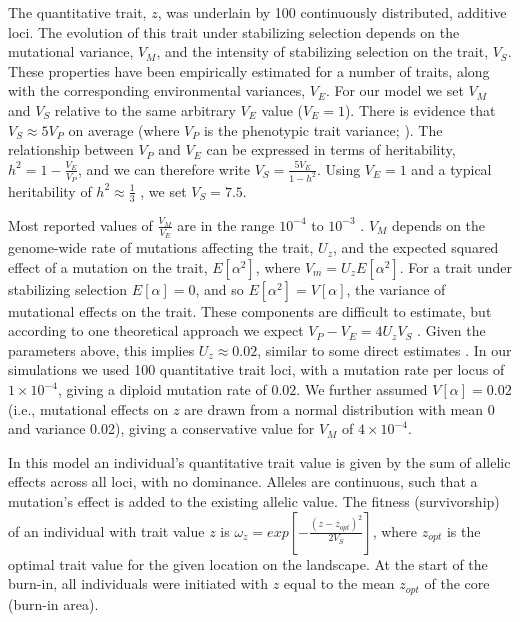 The quantitative trait, $z$, was underlain by 100 continuously distributed, additive loci. The evolution of this trait under stabilizing selection depends on the mutational variance, $V_M$, and the intensity of stabilizing selection on the trait, $V_S$. These properties have been empirically estimated for a number of traits, along with the corresponding environmental variances, $V_E$. For our model we set $V_M$ and $V_S$ relative to the same arbitrary $V_E$ value ($V_E = 1$). There is evidence that $V_S \approx 5 V_P$ on average (where $V_P$ is the phenotypic trait variance; \citet{Kingsolver:2001, Johnson:2005}). The relationship between $V_P$ and $V_E$ can be expressed in terms of heritability, $h^2 = 1 - \frac{V_E}{V_P}$, and we can therefore write $V_S = \frac{5V_E}{1 - h^2}$. Using $V_E = 1$ and a typical heritability of $h^2 \approx \frac{1}{3}$ \citep{Mousseau:1987, Houle:1992}, we set $V_S = 7.5$.  

Most reported values of $\frac{V_M}{V_E}$ are in the range $10^{-4}$ to $10^{-3}$ \citep{Houle:1996}. $V_M$ depends on the genome-wide rate of mutations affecting the trait, $U_z$, and the expected squared effect of a mutation on the trait, $E[\alpha^2]$, where $V_m = U_z E[\alpha^2]$. For a trait under stabilizing selection $E[\alpha] = 0$, and so $E[\alpha^2] = V[\alpha]$, the variance of mutational effects on the trait. These components are difficult to estimate, but according to one theoretical approach we expect $V_P - V_E = 4 U_z V_S$ \citep{Turelli:1984, Charlesworth:2010}. Given the parameters above, this implies $U_z \approx 0.02$, similar to some direct estimates \citep{Lynch:1998}. In our simulations we used 100 quantitative trait loci, with a mutation rate per locus of $1\times10^{-4}$, giving a diploid mutation rate of $0.02$. We further assumed $V[\alpha] = 0.02$ (i.e., mutational effects on $z$ are drawn from a normal distribution with mean 0 and variance 0.02), giving a conservative value for $V_M$ of $4\times10^{-4}$.

In this model an individual's quantitative trait value is given by the sum of allelic effects across all loci, with no dominance. Alleles are continuous, such that a mutation's effect is added to the existing allelic value. The fitness (survivorship) of an individual with trait value $z$ is $\omega_z = exp[-\frac{(z-z_{opt})^2}{2V_S}]$, where $z_{opt}$ is the optimal trait value for the given location on the landscape. At the start of the burn-in, all individuals were initiated with $z$ equal to the mean $z_{opt}$ of the core (burn-in area). 

